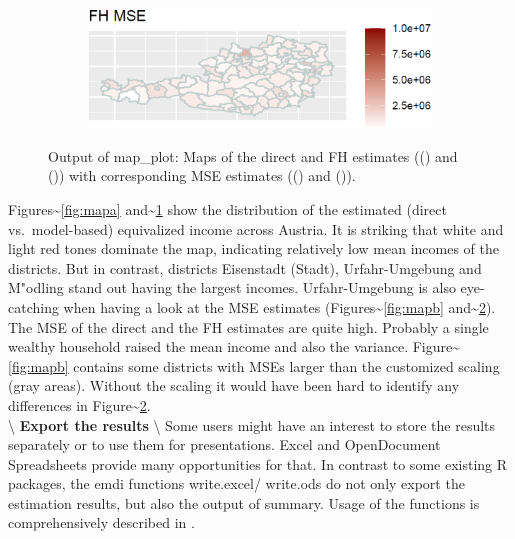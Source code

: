 \begin{example}
\begin{figure}[H]
\begin{subfigure}[t]{0.49\textwidth}
        \label{fig:mapc}
    \end{subfigure}\hfill%
    \begin{subfigure}[t]{0.49\textwidth}
        \includegraphics[width=\textwidth]{figures/map4.png}
        \caption{}
        \label{fig:mapd}
    \end{subfigure}%
    \caption{Output of \texorpdfstring%
{{\normalfont\ttfamily\hyphenchar{} map\_plot}}%
{map\_plot}: Maps of the direct and FH estimates (() and ()) with corresponding MSE estimates (() and ()).}
    \label{fig:mapplot}
\end{figure}

Figures\textasciitilde{}\ref{fig:mapa} and\textasciitilde{}\ref{fig:mapc} show the distribution of the estimated
(direct vs.~model-based) equivalized income across Austria. It is striking that
white and light red tones dominate the map, indicating relatively low mean
incomes of the districts. But in contrast, districts Eisenstadt
(Stadt), Urfahr-Umgebung and M"odling stand out having the largest incomes.
Urfahr-Umgebung is also eye-catching when having a look at the MSE estimates
(Figures\textasciitilde{}\ref{fig:mapb} and\textasciitilde{}\ref{fig:mapd}). The MSE of the direct and the FH
estimates are quite high. Probably a single wealthy household raised the mean
income and also the variance. Figure\textasciitilde{}\ref{fig:mapb} contains some districts with
MSEs larger than the customized scaling (gray areas). Without the scaling it would
have been hard to identify any differences in Figure\textasciitilde{}\ref{fig:mapd}.\\
\textbackslash{} \newline
\textbf{Export the results} \textbackslash{}
Some users might have an interest to store the results separately or to use them
for presentations. Excel and OpenDocument Spreadsheets provide many opportunities for that. In contrast
to some existing R packages, the \texorpdfstring%
{{\normalfont{}\selectfont emdi}}%
{emdi} functions \texorpdfstring%
{{\normalfont\ttfamily\hyphenchar{} write.excel}}%
{write.excel}/\texorpdfstring%
{{\normalfont\ttfamily\hyphenchar{} write.ods}}%
{write.ods}
do not only export the estimation results, but also the output of \texorpdfstring%
{{\normalfont\ttfamily\hyphenchar{} summary}}%
{summary}. Usage of the functions is comprehensively described in \citet{emdi2019}.


\end{example}
